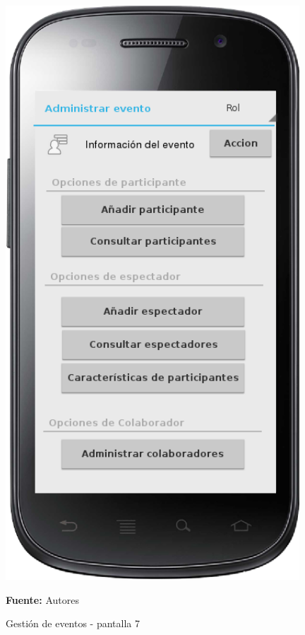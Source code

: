 \begin{figure}[!htb]
  \begin{center}
    \includegraphics[width=11cm]{./imagenes/UI/Eventos/gestion_eventos_7.png}
    \caption{Gestión de eventos - pantalla 7}
    \label{fig:gestion_eventos_7}
    \textbf{Fuente:}  Autores
  \end{center}
\end{figure}

